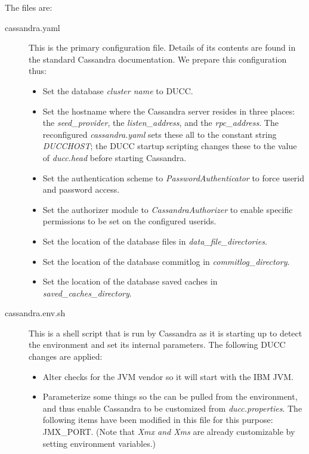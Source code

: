     The files are:
    \begin{description}
      \item[cassandra.yaml] This is the primary configuration file.  Details of its
        contents are found in the standard Cassandra documentation.  We prepare this
        configuration thus:
        \begin{itemize}
          \item Set the database {\em cluster name} to DUCC.
          \item Set the hostname where the Cassandra server resides in three places:
            the {\em seed\_provider}, the {\em listen\_address}, and the {\em rpc\_address}.
            The reconfigured {\em cassandra.yaml} sets these all to the constant string
            {\em DUCCHOST}; the DUCC startup scripting changes these to the value of
            {\em ducc.head} before starting Cassandra.
          \item Set the authentication scheme to {\em PasswordAuthenticator} to force
            userid and password access.
          \item Set the authorizer module to {\em CassandraAuthorizer} to enable specific
            permissions to be set on the configured userids.
          \item Set the location of the database files in {\em data\_file\_directories}.
          \item Set the location of the database commitlog in {\em commitlog\_directory}.
          \item Set the location of the database saved caches in {\em saved\_caches\_directory}.
        \end{itemize}
      \item[cassandra.env.sh] This is a shell script that is run by Cassandra as it is
        starting up to detect the environment and set its internal parameters. The following
        DUCC changes are applied:
        \begin{itemize}
          \item Alter checks for the JVM vendor so it will start with the IBM JVM.
          \item Parameterize some things so the can be pulled from the environment, and
            thus enable Cassandra to be customized from {\em ducc.properties}.  The following
            items have been modified in this file for this purpose: JMX\_PORT.  (Note that
            {\em Xmx and Xms} are already customizable by setting environment variables.)
        \end{itemize}
      \end{description}
    
